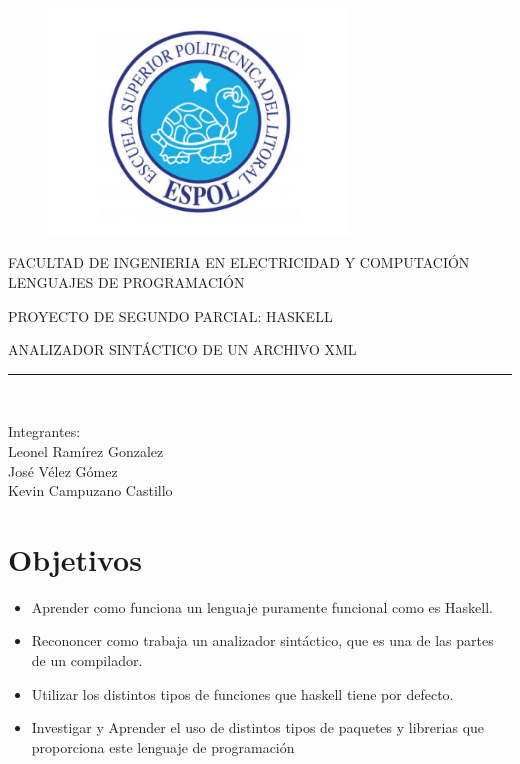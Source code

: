 \documentclass[a4paper,openright,12pt]{report}
\begin{document}
\begin{titlepage}

\begin{center}
\vspace*{-1in}
\begin{figure}[htb]
\begin{center}
\includegraphics[width=8cm]{./imagenes/espol.jpg}
\end{center}
\end{figure}
FACULTAD DE INGENIERIA EN ELECTRICIDAD Y COMPUTACIÓN\\
\vspace*{0.15in}
LENGUAJES DE PROGRAMACIÓN\\
\vspace*{0.6in}
\begin{large}
PROYECTO DE SEGUNDO PARCIAL: HASKELL
\end{large}
\vspace*{0.4in}
\begin{large}
ANALIZADOR SINTÁCTICO DE UN ARCHIVO XML\\
\end{large}
\vspace*{0.3in}
\rule{80mm}{0.1mm}\\
\vspace*{0.1in}
\begin{large}
Integrantes:\\Leonel Ramírez Gonzalez\\José Vélez Gómez\\Kevin Campuzano Castillo\\ 
\end{large}
\end{center}
\end{titlepage}

\tableofcontents
\chapter{Objetivos}
\begin{itemize}
\item {Aprender como funciona un lenguaje puramente funcional como es Haskell.}
\item{Recononcer como trabaja un analizador sintáctico, que es una de las partes de un compilador.}
\item{Utilizar los distintos tipos de funciones que haskell tiene por defecto.}
\item{Investigar y Aprender el uso de distintos tipos de paquetes y librerias que proporciona este lenguaje de programación}
\end{itemize}
\end{document}
